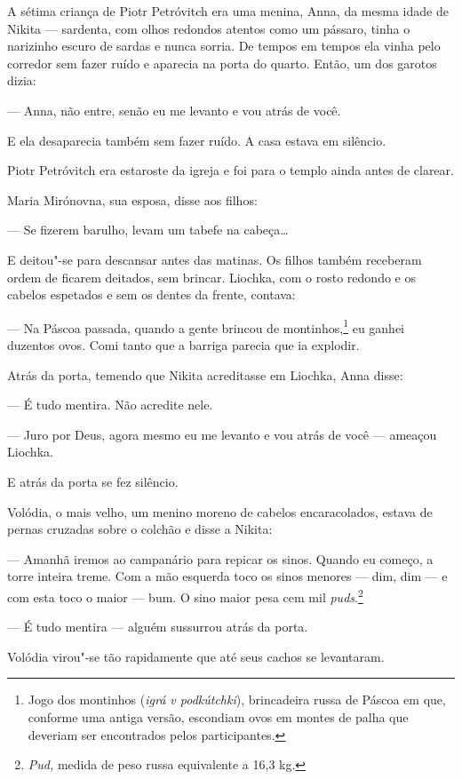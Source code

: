 A sétima criança de Piotr Petróvitch era uma menina, Anna, da mesma
idade de Nikita --- sardenta, com olhos redondos atentos como um
pássaro, tinha o narizinho escuro de sardas e nunca sorria. De
tempos em tempos ela vinha pelo corredor sem fazer ruído e aparecia na
porta do quarto. Então, um dos garotos dizia:

--- Anna, não entre, senão eu me levanto e vou atrás de você.

E ela desaparecia também sem fazer ruído. A casa estava em silêncio.

Piotr Petróvitch era estaroste da igreja e foi para o templo ainda antes
de clarear.

Maria Mirónovna, sua esposa, disse aos filhos:

--- Se fizerem barulho, levam um tabefe na cabeça\ldots{}

E deitou"-se para descansar antes das matinas. Os filhos também receberam
ordem de ficarem deitados, sem brincar. Liochka, com o rosto redondo e
os cabelos espetados e sem os dentes da frente, contava:

--- Na Páscoa passada, quando a gente brincou de montinhos,\footnote{Jogo
  dos montinhos (\emph{igrá v podkútchki}), brincadeira russa de Páscoa
  em que, conforme uma antiga versão, escondiam ovos em montes de palha que
  deveriam ser encontrados pelos participantes.} eu ganhei duzentos
ovos. Comi tanto que a barriga parecia que ia explodir.

Atrás da porta, temendo que Nikita acreditasse em Liochka, Anna disse:

--- É tudo mentira. Não acredite nele.

--- Juro por Deus, agora mesmo eu me levanto e vou atrás de você ---
ameaçou Liochka.

E atrás da porta se fez silêncio.

Volódia, o mais velho, um menino moreno de cabelos encaracolados, estava
de pernas cruzadas sobre o colchão e disse a Nikita:

--- Amanhã iremos ao campanário para repicar os sinos. Quando eu começo,
a torre inteira treme. Com a mão esquerda toco os sinos menores --- dim,
dim --- e com esta toco o maior --- bum. O sino maior pesa cem mil
\emph{puds}.\footnote{\emph{Pud,} medida de peso russa equivalente a
  16,3 kg.}

--- É tudo mentira --- alguém sussurrou atrás da porta.

Volódia virou"-se tão rapidamente que até seus cachos se levantaram.

